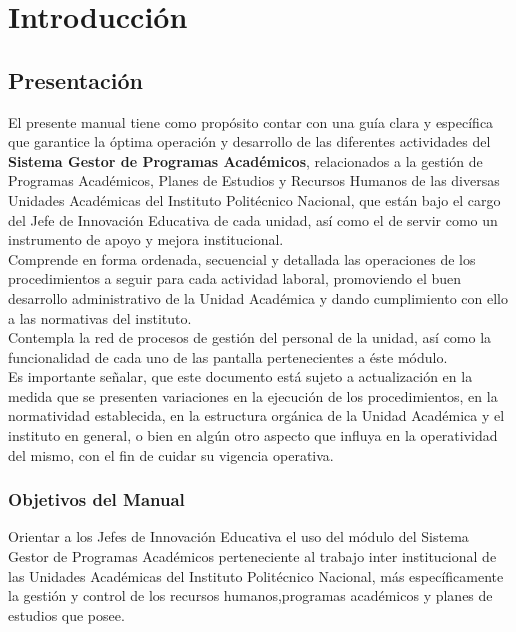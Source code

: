 \chapter{Introducción}
\section{Presentación}
El presente manual tiene como propósito contar con una guía clara y específica que garantice la óptima operación y desarrollo de las diferentes actividades del \textbf{Sistema Gestor de Programas Académicos}, relacionados a la gestión de Programas Académicos, Planes de Estudios y Recursos Humanos de las diversas Unidades Académicas del Instituto Politécnico Nacional, que están bajo el cargo del Jefe de Innovación Educativa de cada unidad, así como el de servir como un instrumento de apoyo y mejora institucional.\\

Comprende en forma ordenada, secuencial y detallada las operaciones de los procedimientos a seguir para cada actividad laboral, promoviendo el buen desarrollo administrativo de la Unidad Académica y dando cumplimiento con ello a las normativas del instituto.\\

Contempla la red de procesos de gestión del personal de la unidad, así como la funcionalidad de cada uno de las pantalla pertenecientes a éste módulo.\\

Es importante señalar, que este documento está sujeto a actualización en la medida que se presenten variaciones en la ejecución de los procedimientos, en la normatividad establecida, en la estructura orgánica de la Unidad Académica y el instituto en general, o bien en algún otro aspecto que influya en la operatividad del mismo, con el fin de cuidar su vigencia operativa.\\

    \subsection{Objetivos del Manual}
     Orientar a los Jefes de Innovación Educativa el uso del módulo del Sistema Gestor de Programas Académicos perteneciente al trabajo inter institucional de las Unidades Académicas del Instituto Politécnico Nacional, más específicamente la gestión y control de los recursos humanos,programas académicos y planes de estudios que posee.

